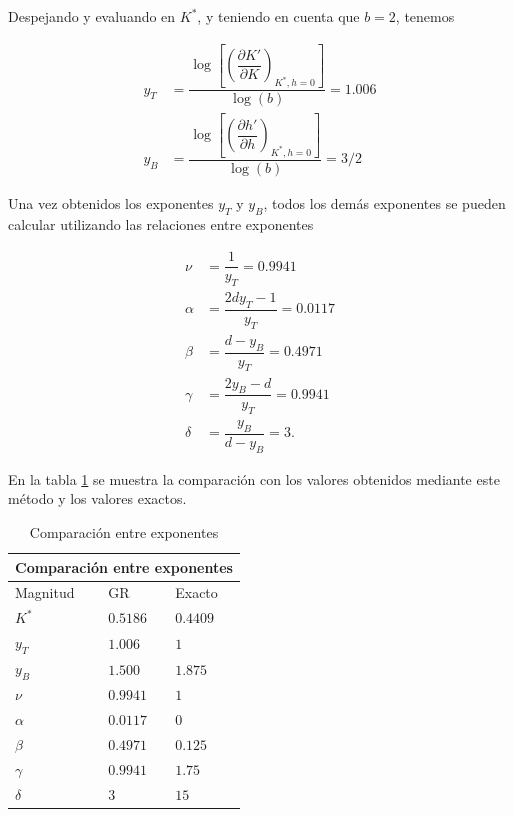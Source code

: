 \documentclass[10pt]{article}
\begin{document}
Despejando y evaluando en $K^*$, y teniendo en cuenta que $b=2$, tenemos

\begin{align}
y_T &= \dfrac{\log\left[ \left( \dfrac{\partial K'}{\partial K}  \right)_{K^{*},h=0} \right]}{\log(b)} = 1.006 \\
y_B &= \dfrac{\log\left[ \left( \dfrac{\partial h'}{\partial h}  \right)_{K^{*},h=0} \right]}{\log(b)} = 3/2
\end{align}

Una vez obtenidos los exponentes $y_T$ y $y_B$, todos los dem\'as exponentes se pueden calcular utilizando las relaciones entre exponentes

\begin{align}
\nu &= \dfrac{1}{y_T} =0.9941\\
\alpha &= \dfrac{2d y_T - 1}{y_T} = 0.0117 \\
\beta &= \dfrac{d-y_B}{y_T} = 0.4971 \\
\gamma &= \dfrac{2 y_B - d}{y_T} = 0.9941 \\
\delta &= \dfrac{y_B}{d-y_B} = 3.
\end{align}

En la tabla \ref{tabla} se muestra la comparaci\'on con los valores obtenidos mediante este m\'etodo y los valores exactos.

\begin{table}
\centering
\begin{tabular}{ |p{2cm}||p{2cm}|p{2cm}|  }
 \hline
 \multicolumn{3}{|c|}{Comparaci\'on entre exponentes} \\
 \hline
 Magnitud& GR &Exacto\\
 \hline
 $K^*$    & $0.5186$  & $0.4409$\\
 $y_T$    & $1.006$  & $1$\\
 $y_B$    & $1.500$  & $1.875$\\
 $\nu$    & $0.9941$ & $1$\\
 $\alpha$ & $0.0117$ & $0$\\
 $\beta$  & $0.4971$ & $0.125$\\
 $\gamma$ & $0.9941$ & $1.75$   \\
 $\delta$ & $3$      & $15$\\
 \hline
\end{tabular}
\caption{\label{tabla} Comparaci\'on entre exponentes}
\end{table}
\end{document}
